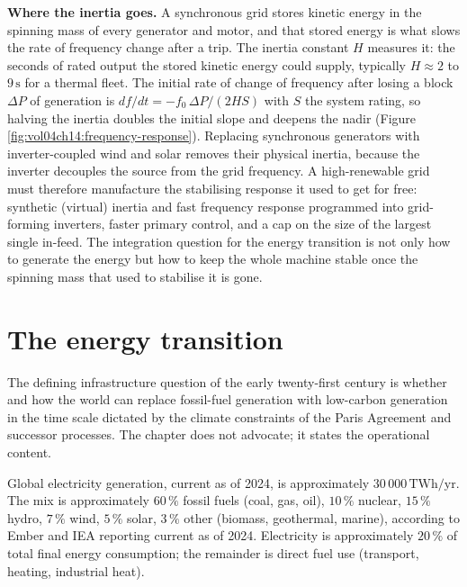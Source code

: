 \begin{mastery}
\textbf{Where the inertia goes.} A synchronous grid stores kinetic
energy in the spinning mass of every generator and motor, and that
stored energy is what slows the rate of frequency change after a trip.
The inertia constant $H$ measures it: the seconds of rated output the
stored kinetic energy could supply, typically $H \approx 2$ to $9\,\si{
\second}$ for a thermal fleet. The initial rate of change of frequency
after losing a block $\Delta P$ of generation is $df/dt = -f_0\,\Delta
P/(2H S)$ with $S$ the system rating, so halving the inertia doubles the
initial slope and deepens the nadir (Figure
\ref{fig:vol04ch14:frequency-response}). Replacing synchronous
generators with inverter-coupled wind and solar removes their physical
inertia, because the inverter decouples the source from the grid
frequency. A high-renewable grid must therefore manufacture the
stabilising response it used to get for free: synthetic (virtual)
inertia and fast frequency response programmed into grid-forming
inverters, faster primary control, and a cap on the size of the largest
single in-feed. The integration question for the energy transition is
not only how to generate the energy but how to keep the whole machine
stable once the spinning mass that used to stabilise it is gone.
\end{mastery}

\section{The energy transition}

The defining infrastructure question of the early twenty-first
century is whether and how the world can replace fossil-fuel
generation with low-carbon generation in the time scale dictated by
the climate constraints of the Paris Agreement and successor
processes. The chapter does not advocate; it states the operational
content.

Global electricity generation, current as of 2024, is approximately
$30\,000\,\text{TWh}/\text{yr}$. The mix is approximately
$60\,\%$ fossil fuels (coal, gas, oil), $10\,\%$ nuclear, $15\,\%$
hydro, $7\,\%$ wind, $5\,\%$ solar, $3\,\%$ other (biomass,
geothermal, marine), according to Ember and IEA reporting current as
of 2024. Electricity is approximately $20\,\%$ of total final energy
consumption; the remainder is direct fuel use (transport, heating,
industrial heat).



